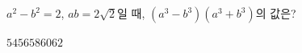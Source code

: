 $a^2-b^2=2$, $ab=2\sqrt{2}$일 때, $(a^3-b^3)(a^3+b^3)$의 값은?
\begin{choices32}{$54$}{$56$}{$58$}{$60$}{$62$}\end{choices32}
